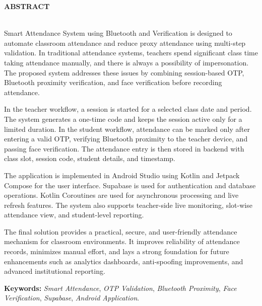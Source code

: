 {\centerline { {\large \textbf{ABSTRACT}}}}
~\\

Smart Attendance System using Bluetooth and Verification is designed to automate classroom attendance and reduce proxy attendance using multi-step validation. In traditional attendance systems, teachers spend significant class time taking attendance manually, and there is always a possibility of impersonation. The proposed system addresses these issues by combining session-based OTP, Bluetooth proximity verification, and face verification before recording attendance.

In the teacher workflow, a session is started for a selected class date and period. The system generates a one-time code and keeps the session active only for a limited duration. In the student workflow, attendance can be marked only after entering a valid OTP, verifying Bluetooth proximity to the teacher device, and passing face verification. The attendance entry is then stored in backend with class slot, session code, student details, and timestamp.

The application is implemented in Android Studio using Kotlin and Jetpack Compose for the user interface. Supabase is used for authentication and database operations. Kotlin Coroutines are used for asynchronous processing and live refresh features. The system also supports teacher-side live monitoring, slot-wise attendance view, and student-level reporting.

The final solution provides a practical, secure, and user-friendly attendance mechanism for classroom environments. It improves reliability of attendance records, minimizes manual effort, and lays a strong foundation for future enhancements such as analytics dashboards, anti-spoofing improvements, and advanced institutional reporting.
     
\vskip 0.5cm
\noindent
\textbf{Keywords:} {\it Smart Attendance}, {\it OTP Validation}, {\it Bluetooth Proximity}, {\it Face Verification}, {\it Supabase}, {\it Android Application}.  


